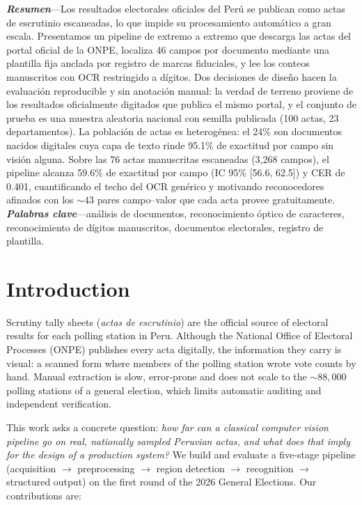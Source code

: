 \documentclass[conference]{IEEEtran}
\begin{document}
\noindent\textbf{\textit{Resumen}}---Los resultados electorales oficiales del
Per\'u se publican como actas de escrutinio escaneadas, lo que impide su
procesamiento autom\'atico a gran escala. Presentamos un pipeline de extremo a
extremo que descarga las actas del portal oficial de la ONPE, localiza 46
campos por documento mediante una plantilla fija anclada por registro de
marcas fiduciales, y lee los conteos manuscritos con OCR restringido a
d\'igitos. Dos decisiones de dise\~no hacen la evaluaci\'on reproducible y sin
anotaci\'on manual: la verdad de terreno proviene de los resultados
oficialmente digitados que publica el mismo portal, y el conjunto de prueba es
una muestra aleatoria nacional con semilla publicada (100 actas, 23
departamentos). La poblaci\'on de actas es heterog\'enea: el 24\% son
documentos nacidos digitales cuya capa de texto rinde 95.1\% de exactitud por
campo sin visi\'on alguna. Sobre las 76 actas manuscritas escaneadas (3,268
campos), el pipeline alcanza 59.6\% de exactitud por campo (IC 95\% [56.6,
62.5]) y CER de 0.401, cuantificando el techo del OCR gen\'erico y motivando
reconocedores afinados con los ${\sim}43$ pares campo--valor que cada acta
provee gratuitamente.\\[4pt]
\noindent\textbf{\textit{Palabras clave}}---an\'alisis de documentos,
reconocimiento \'optico de caracteres, reconocimiento de d\'igitos
manuscritos, documentos electorales, registro de plantilla.

\section{Introduction}
Scrutiny tally sheets (\emph{actas de escrutinio}) are the official source of
electoral results for each polling station in Peru. Although the National
Office of Electoral Processes (ONPE) publishes every acta digitally, the
information they carry is visual: a scanned form where members of the polling
station wrote vote counts by hand. Manual extraction is slow, error-prone and
does not scale to the ${\sim}88{,}000$ polling stations of a general election,
which limits automatic auditing and independent verification.

This work asks a concrete question: \emph{how far can a classical computer
vision pipeline go on real, nationally sampled Peruvian actas, and what does
that imply for the design of a production system?} We build and evaluate a
five-stage pipeline (acquisition $\rightarrow$ preprocessing $\rightarrow$
region detection $\rightarrow$ recognition $\rightarrow$ structured output)
on the first round of the 2026 General Elections. Our contributions are:
\end{document}
